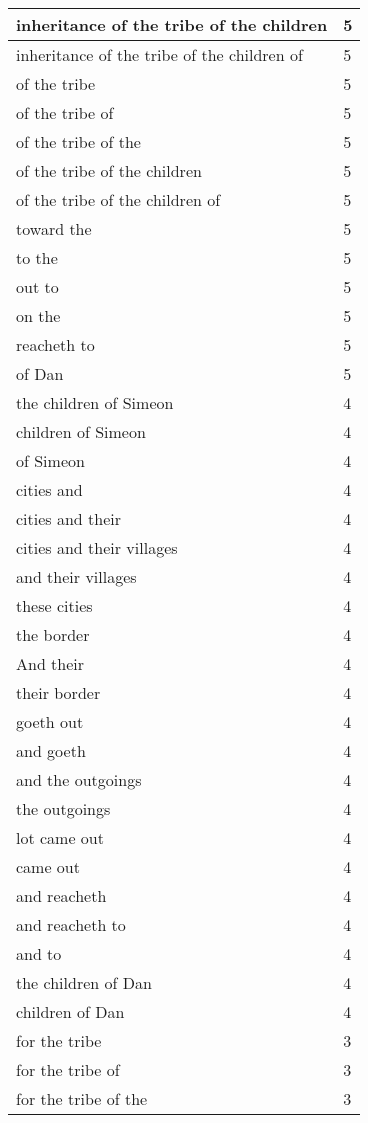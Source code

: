 \begin{center}
\begin{longtable}{|p{3.0in}|p{0.5in}|}
inheritance of the tribe of the children & 5\\ \hline 
inheritance of the tribe of the children of & 5\\ \hline 
of the tribe & 5\\ \hline 
of the tribe of & 5\\ \hline 
of the tribe of the & 5\\ \hline 
of the tribe of the children & 5\\ \hline 
of the tribe of the children of & 5\\ \hline 
toward the & 5\\ \hline 
to the & 5\\ \hline 
out to & 5\\ \hline 
on the & 5\\ \hline 
reacheth to & 5\\ \hline 
of Dan & 5\\ \hline 
the children of Simeon & 4\\ \hline 
children of Simeon & 4\\ \hline 
of Simeon & 4\\ \hline 
cities and & 4\\ \hline 
cities and their & 4\\ \hline 
cities and their villages & 4\\ \hline 
and their villages & 4\\ \hline 
these cities & 4\\ \hline 
the border & 4\\ \hline 
And their & 4\\ \hline 
their border & 4\\ \hline 
goeth out & 4\\ \hline 
and goeth & 4\\ \hline 
and the outgoings & 4\\ \hline 
the outgoings & 4\\ \hline 
lot came out & 4\\ \hline 
came out & 4\\ \hline 
and reacheth & 4\\ \hline 
and reacheth to & 4\\ \hline 
and to & 4\\ \hline 
the children of Dan & 4\\ \hline 
children of Dan & 4\\ \hline 
for the tribe & 3\\ \hline 
for the tribe of & 3\\ \hline 
for the tribe of the & 3\\ \hline 

\end{longtable}
\end{center}
